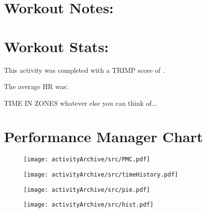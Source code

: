 \documentclass[letterpaper]{article}
\begin{document}
\section{Workout Notes:}



\section{Workout Stats:}
This activity was completed with a TRIMP score of .

The average HR was: 

TIME IN ZONES
whatever else you can think of...

\section{Performance Manager Chart}
\begin{figure}[H]
\centering
\texttt{[image: activityArchive/src/PMC.pdf]}
\end{figure}

\begin{figure}[H]
\centering
\texttt{[image: activityArchive/src/timeHistory.pdf]}
\end{figure}
\begin{figure}[H]
\centering
\texttt{[image: activityArchive/src/pie.pdf]}
\end{figure}
\begin{figure}[H]
\centering
\texttt{[image: activityArchive/src/hist.pdf]}
\end{figure}
\end{document}
